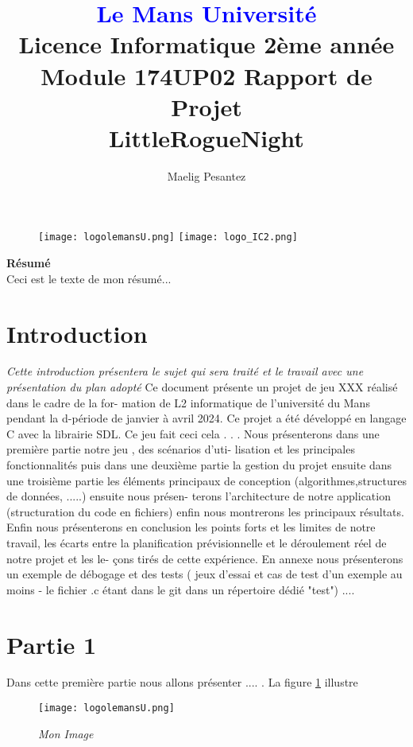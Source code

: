 \documentclass[10pt]{article}
\begin{document}
\begin{figure}
\texttt{[image: logolemansU.png]}
\hspace{160pt}
\texttt{[image: logo\_IC2.png]}
\end{figure}

\title{\textbf{\textcolor{blue}{Le Mans Université}}\\Licence Informatique 2ème année\\Module 174UP02 Rapport de Projet\\\textbf{LittleRogueNight}}
\author{Maelig Pesantez}
\maketitle

\newpage
\tableofcontents

\newpage
\textbf{Résumé}\\
Ceci est le texte de mon résumé...
\section{Introduction}
\textit{Cette introduction présentera le sujet qui sera traité et le travail avec une
présentation du plan adopté}
Ce document présente un projet de jeu XXX réalisé dans le cadre de la for-
mation de L2 informatique de l’université du Mans pendant la d-période de
janvier à avril 2024. Ce projet a été développé en langage C avec la librairie
SDL. Ce jeu fait ceci cela . . .
Nous présenterons dans une première partie notre jeu , des scénarios d’uti-
lisation et les principales fonctionnalités puis dans une deuxième partie la
gestion du projet ensuite dans une troisième partie les éléments principaux
de conception (algorithmes,structures de données, .....) ensuite nous présen-
terons l’architecture de notre application (structuration du code en fichiers)
enfin nous montrerons les principaux résultats. Enfin nous présenterons en
conclusion les points forts et les limites de notre travail, les écarts entre la
planification prévisionnelle et le déroulement réel de notre projet et les le-
çons tirés de cette expérience. En annexe nous présenterons un exemple de
débogage et des tests ( jeux d’essai et cas de test d’un exemple au moins -
le fichier .c étant dans le git dans un répertoire dédié "test") ....

\section{Partie 1}
Dans cette première partie nous allons présenter .... . La figure \ref{fig1} illustre
\begin{figure}[h]
   \begin{center}
      \texttt{[image: logolemansU.png]}\\
      \caption{{\emph{Mon Image}}}
      \label{fig1}
   \end{center}
\end{figure}
\end{document}

